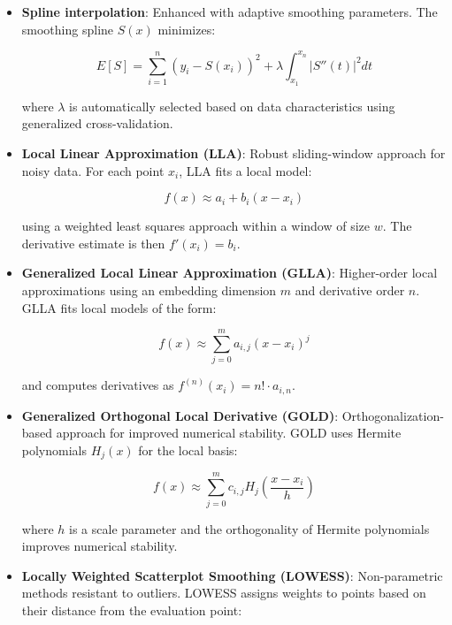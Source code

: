 \documentclass[10pt,journal,compsoc]{IEEEtran}
\begin{document}
\begin{itemize}
    \item \textbf{Spline interpolation}: Enhanced with adaptive smoothing parameters. The smoothing spline $S(x)$ minimizes:
    
    \begin{equation}
        E[S] = \sum_{i=1}^{n} \left(y_i - S(x_i)\right)^2 + \lambda \int_{x_1}^{x_n} \left|S''(t)\right|^2 dt
    \end{equation}
    
    where $\lambda$ is automatically selected based on data characteristics using generalized cross-validation.
    
    \item \textbf{Local Linear Approximation (LLA)}: Robust sliding-window approach for noisy data. For each point $x_i$, LLA fits a local model:
    
    \begin{equation}
        f(x) \approx a_i + b_i(x - x_i)
    \end{equation}
    
    using a weighted least squares approach within a window of size $w$. The derivative estimate is then $f'(x_i) = b_i$.
    
    \item \textbf{Generalized Local Linear Approximation (GLLA)}: Higher-order local approximations using an embedding dimension $m$ and derivative order $n$. GLLA fits local models of the form:
    
    \begin{equation}
        f(x) \approx \sum_{j=0}^{m} a_{i,j}(x - x_i)^j
    \end{equation}
    
    and computes derivatives as $f^{(n)}(x_i) = n! \cdot a_{i,n}$.
    
    \item \textbf{Generalized Orthogonal Local Derivative (GOLD)}: Orthogonalization-based approach for improved numerical stability. GOLD uses Hermite polynomials $H_j(x)$ for the local basis:
    
    \begin{equation}
        f(x) \approx \sum_{j=0}^{m} c_{i,j}H_j\left(\frac{x - x_i}{h}\right)
    \end{equation}
    
    where $h$ is a scale parameter and the orthogonality of Hermite polynomials improves numerical stability.
    
    \item \textbf{Locally Weighted Scatterplot Smoothing (LOWESS)}: Non-parametric methods resistant to outliers. LOWESS assigns weights to points based on their distance from the evaluation point:
    

\end{itemize}
\end{document}
